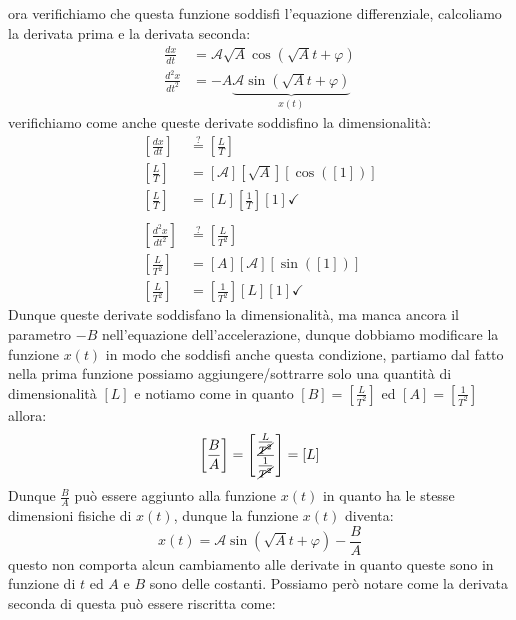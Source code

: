         ora verifichiamo che questa funzione soddisfi l'equazione differenziale, calcoliamo la derivata prima e la derivata seconda:
        $$
            \begin{aligned}
                \frac{dx}{dt} &= \mathcal{A}\sqrt{A}\cos(\sqrt{A}t + \varphi)\\
                \frac{d^2x}{dt^2} &= -A\underbrace{\mathcal{A}\sin(\sqrt{A}t + \varphi)}_{x(t)}
            \end{aligned}
        $$
        verifichiamo come anche queste derivate soddisfino la dimensionalità:
        $$
            \begin{aligned}
                \left[\frac{dx}{dt}\right] &\stackrel?= \left[\frac{L}{T}\right] \\
                \left[\frac{L}{T}\right] &= \left[\mathcal{A}\right]\left[\sqrt{A}\right]\left[\cos(\left[1\right])\right]\\
                \left[\frac{L}{T}\right] &= \left[L\right]\left[\frac{1}{T}\right]\left[1\right]\checkmark\\
                \\ 
                \left[\frac{d^2x}{dt^2}\right] &\stackrel?= \left[\frac{L}{T^2}\right] \\
                \left[\frac{L}{T^2}\right] &= \left[A\right]\left[\mathcal{A}\right]\left[\sin(\left[1\right])\right]\\
                \left[\frac{L}{T^2}\right] &= \left[\frac{1}{T^2}\right]\left[L\right]\left[1\right]\checkmark
            \end{aligned}
        $$
        Dunque queste derivate soddisfano la dimensionalità, ma manca ancora il parametro $-B$ nell'equazione dell'accelerazione, dunque dobbiamo modificare la funzione $x(t)$ in modo che soddisfi anche questa condizione, partiamo dal fatto nella prima funzione possiamo aggiungere/sottrarre solo una quantità di dimensionalità $\left[L\right]$ e notiamo come in quanto $\left[B\right]=\left[\frac{L}{T^2}\right]$ ed $\left[A\right]=\left[\frac{1}{T^2}\right]$ allora: 
        $$
            \left[\frac{B}{A}\right] = \left[\frac{\frac{L}{\cancel{T^2}}}{\frac{1}{\cancel{T^2}}}\right] = \left[L\right]
        $$
        Dunque $\frac{B}{A}$ può essere aggiunto alla funzione $x(t)$ in quanto ha le stesse dimensioni fisiche di $x(t)$, dunque la funzione $x(t)$ diventa:
        $$
            x(t) = \mathcal{A}\sin(\sqrt{A}t + \varphi) - \frac{B}{A}
        $$
        questo non comporta alcun cambiamento alle derivate in quanto queste sono in funzione di $t$ ed $A$ e $B$ sono delle costanti. Possiamo però notare come la derivata seconda di questa può essere riscritta come:
